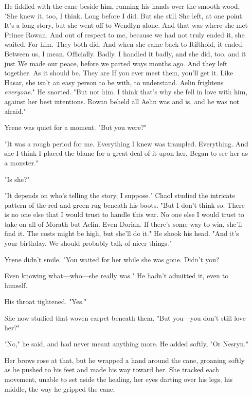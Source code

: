 He fiddled with the cane beside him, running his hands over the smooth wood. "She knew it, too, I think. Long before I did. But she still
 She left, at one point. It's a long story, but she went off to Wendlyn alone. And that was where she met Prince Rowan. And out of respect to me, because we had not truly ended it, she waited. For him. They both did. And when she came back to Rifthold, it ended. Between us, I mean. Officially. Badly. I handled it badly, and she did, too, and it just  We made our peace, before we parted ways months ago. And they left together. As it should be. They are  If you ever meet them, you'll get it. Like Hasar, she isn't an easy person to be with, to understand. Aelin frightens \emph{everyone}." He snorted. "But not him. I think that's why she fell in love with him, against her best intentions. Rowan beheld all Aelin was and is, and he was not afraid."

Yrene was quiet for a moment. "But you were?"

"It was a  rough period for me. Everything I knew was trampled. Everything. And she  I think I placed the blame for a great deal of it upon her. Began to see her as a monster."

"Is she?"

"It depends on who's telling the story, I suppose." Chaol studied the intricate pattern of the red-and-green rug beneath his boots. "But I don't think so. There is no one else that I would trust to handle this war. No one else I would trust to take on all of Morath but Aelin. Even Dorian. If there's some way to win, she'll find it. The costs might be high, but she'll do it." He shook his head. "And it's your birthday. We should probably talk of nicer things."

Yrene didn't smile. "You waited for her while she was gone. Didn't you?

Even knowing what---who---she really was." He hadn't admitted it, even to himself.

His throat tightened. "Yes."

She now studied that woven carpet beneath them. "But you---you don't still love her?"

"No," he said, and had never meant anything more. He added softly, "Or Nesryn."

Her brows rose at that, but he wrapped a hand around the cane, groaning softly as he pushed to his feet and made his way toward her. She tracked each movement, unable to set aside the healing, her eyes darting over his legs, his middle, the way he gripped the cane.

